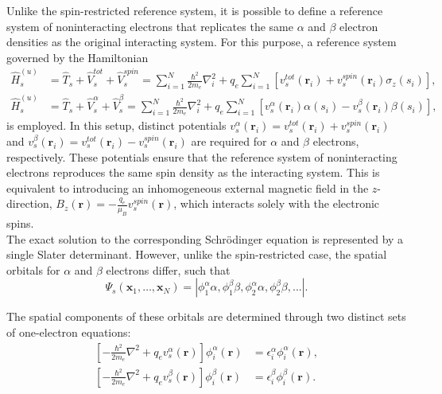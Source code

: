 \documentclass[%
 preprint, linenumbers,
 amsmath,amssymb,
 aps, physrev,
]{revtex4-2}
\begin{document}
Unlike the spin-restricted reference system, it is possible to define a reference system of noninteracting electrons that replicates the same $\alpha$ and $\beta$ electron densities as the original interacting system. For this purpose, a reference system governed by the Hamiltonian
\begin{align}
    \hat{H}_s^{(u)} &= \hat{T}_s + \hat{V}_s^{tot} + \hat{V}_s^{spin} = \sum_{i=1}^{N}\frac{\hbar^2}{2m_e}\nabla_i^2 + q_e\sum_{i=1}^{N}\left[ v_s^{tot}(\mathbf{r}_i) + v_s^{spin}(\mathbf{r}_i)\sigma_z(s_i) \right], \\
   \hat{H}_s^{(u)} &= \hat{T}_s + \hat{V}_s^{\alpha} + \hat{V}_s^{\beta} = \sum_{i=1}^{N}\frac{\hbar^2}{2m_e}\nabla_i^2 + q_e\sum_{i=1}^{N}\left[ v_s^{\alpha}(\mathbf{r}_i)\alpha(s_i) - v_s^{\beta}(\mathbf{r}_i)\beta(s_i) \right],
    \label{eq:78}
\end{align}
is employed. In this setup, distinct potentials $v_s^{\alpha}(\mathbf{r}_i) = v_s^{tot}(\mathbf{r}_i) + v_s^{spin}(\mathbf{r}_i)$ and $v_s^{\beta}(\mathbf{r}_i) = v_s^{tot}(\mathbf{r}_i) - v_s^{spin}(\mathbf{r}_i)$ are required for $\alpha$ and $\beta$ electrons, respectively. These potentials ensure that the reference system of noninteracting electrons reproduces the same spin density as the interacting system. This is equivalent to introducing an inhomogeneous external magnetic field in the $z$-direction, $B_z(\mathbf{r}) = -\frac{q_e}{\mu_B}v_s^{spin}(\mathbf{r})$, which interacts solely with the electronic spins.\\

The exact solution to the corresponding Schrödinger equation is represented by a single Slater determinant. However, unlike the spin-restricted case, the spatial orbitals for $\alpha$ and $\beta$ electrons differ, such that
\begin{equation}
    \Psi_s(\mathbf{x}_1, \dots, \mathbf{x}_N) = |\phi_1^{\alpha} \alpha,\phi_1^{\beta}\beta,\phi_2^{\alpha}\alpha,\phi_2^{\beta}\beta,...|.
\end{equation}

The spatial components of these orbitals are determined through two distinct sets of one-electron equations:
\begin{align}
    \left[ -\frac{\hbar^2}{2m_e}\nabla^2 + q_ev_s^{\alpha}(\mathbf{r}) \right]\phi_i^{\alpha}(\mathbf{r}) &= \epsilon_i^{\alpha}\phi_i^{\alpha}(\mathbf{r}), \\
    \left[ -\frac{\hbar^2}{2m_e}\nabla^2 + q_ev_s^{\beta}(\mathbf{r}) \right]\phi_i^{\beta}(\mathbf{r}) &= \epsilon_i^{\beta}\phi_i^{\beta}(\mathbf{r}).
\end{align}
\end{document}
